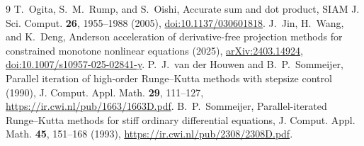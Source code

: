 \documentclass[aps,pra,reprint,onecolumn,12pt,notitlepage,superscriptaddress,nofootinbib]{revtex4-2}
\begin{document}
\begin{thebibliography}{9}
 T.~Ogita, S.~M.~Rump, and S.~Oishi,
Accurate sum and dot product, SIAM J. Sci. Comput. \textbf{26}, 1955--1988
(2005), \href{https://doi.org/10.1137/030601818}{doi:10.1137/030601818}.
 J.~Jin, H.~Wang, and K.~Deng,
Anderson acceleration of derivative-free projection methods for constrained
monotone nonlinear equations (2025),
\href{https://arxiv.org/abs/2403.14924}{arXiv:2403.14924},
\href{https://doi.org/10.1007/s10957-025-02841-y}{doi:10.1007/s10957-025-02841-y}.
 P.~J.~van der Houwen and B.~P.~Sommeijer,
Parallel iteration of high-order Runge--Kutta methods with stepsize control
(1990), J. Comput. Appl. Math. \textbf{29}, 111--127,
\url{https://ir.cwi.nl/pub/1663/1663D.pdf}.
 B.~P.~Sommeijer, Parallel-iterated Runge--Kutta methods
for stiff ordinary differential equations, J. Comput. Appl. Math.
\textbf{45}, 151--168 (1993),
\url{https://ir.cwi.nl/pub/2308/2308D.pdf}.
\end{thebibliography}
\end{document}
